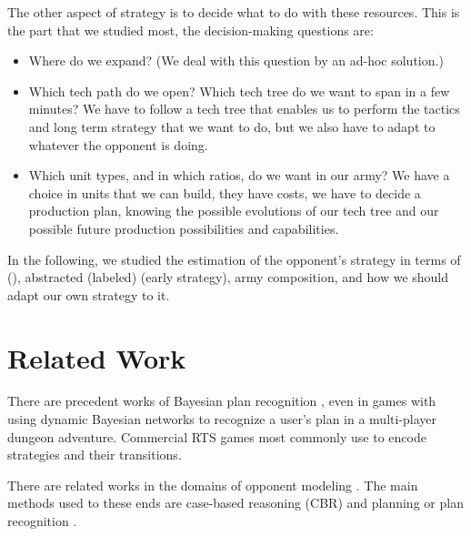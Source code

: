 The other aspect of strategy is to decide what to do with these resources. This is the part that we studied most, the decision-making questions are:
\begin{itemize}
    \item Where do we expand? (We deal with this question by an ad-hoc solution.)
    \item Which tech path do we open? Which tech tree do we want to span in a few minutes? We have to follow a tech tree that enables us to perform the tactics and long term strategy that we want to do, but we also have to adapt to whatever the opponent is doing.
    \item Which unit types, and in which ratios, do we want in our army? We have a choice in units that we can build, they have costs, we have to decide a production plan, knowing the possible evolutions of our tech tree and our possible future production possibilities and capabilities.
\end{itemize}

In the following, we studied the estimation of the opponent's strategy in terms of  (), abstracted (labeled)  (early strategy), army composition, and how we should adapt our own strategy to it.

\section{Related Work}


There are precedent works of Bayesian plan recognition \citep{BMPR}, even in games with \citep{BayesianRecog} using dynamic Bayesian networks to recognize a user's plan in a multi-player dungeon adventure. Commercial RTS games most commonly use  \citep{FSM_AIGameProgWisdom2003} to encode strategies and their transitions.

There are related works in the domains of opponent modeling \citep{HsiehS08,schadd2007opponent,Kabanza2010}. The main methods used to these ends are case-based reasoning (CBR) and planning or plan recognition \citep{LTW,CBR_Planning,OntanonCBR,HTNPlanning,Ramirez}.

